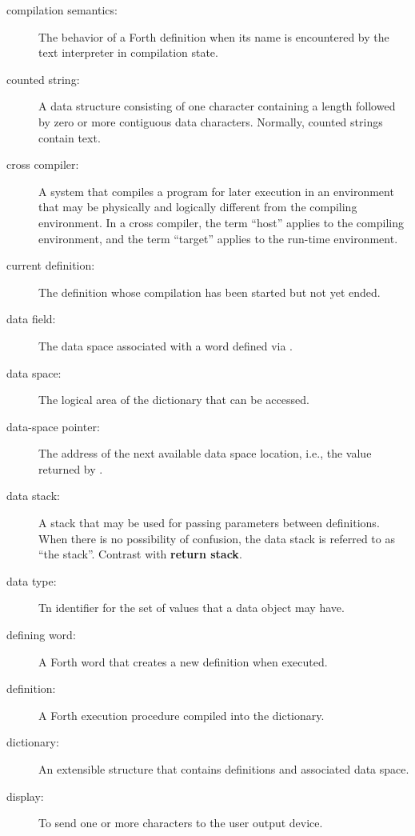 \begin{description}
\item[compilation semantics:]
The behavior of a Forth definition when its name is encountered
by the text interpreter in compilation state.

\item[counted string:]
A data structure consisting of one character containing a length
followed by zero or more contiguous data characters. Normally,
counted strings contain text.

\item[cross compiler:]
A system that compiles a program for later execution in an
environment that may be physically and logically different
from the compiling environment. In a cross compiler, the term
``host'' applies to the compiling environment, and the term
``target'' applies to the run-time environment.

\item[current definition:]
The definition whose compilation has been started but not yet ended.

\item[data field:]
The data space associated with a word defined via .

\item[data space:]
The logical area of the dictionary that can be accessed.

\item[data-space pointer:]
The address of the next available data space location, i.e., the
value returned by .

\item[data stack:]
A stack that may be used for passing parameters between
definitions. When there is no possibility of confusion, the
data stack is referred to as ``the stack''. Contrast with
\textbf{return stack}.

\item[data type:]
Tn identifier for the set of values that a data object may have.

\item[defining word:]
A Forth word that creates a new definition when executed.

\item[definition:]
A Forth execution procedure compiled into the dictionary.

\item[dictionary:]
An extensible structure that contains definitions and
associated data space.

\item[display:]
To send one or more characters to the user output device.


\end{description}
